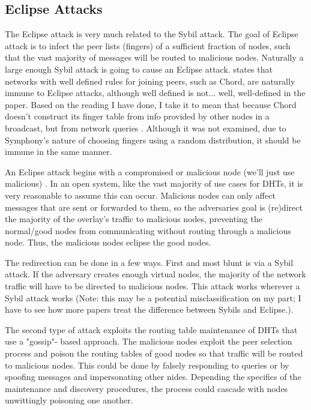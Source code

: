 \documentclass[10pt,letterpaper]{report}
\begin{document}
\subsection{Eclipse Attacks}
The Eclipse attack is very much related to the Sybil attack.  The goal of Eclipse attack is to infect the peer lists (fingers) of a sufficient fraction of nodes, such that the vast majority of messages will be routed to malicious nodes.  Naturally  a large enough Sybil attack is  going to cause an Eclipse attack. \cite{dhtsec} states that networks with well defined rules for joining peers, such as Chord, are naturally immune to Eclipse attacks, although well defined is not... well, well-defined in the paper.  Based on the reading I have done, I take it to mean that because Chord doesn't construct its finger table from info provided by other nodes in a broadcast, but from network queries .  Although it was not examined, due to Symphony's nature of choosing  fingers using a random distribution, it should be immune in the same manner.

An Eclipse attack begins with a compromised or malicious node (we'll just use malicious) \cite{induced}.  In an open system, like the vast majority of use cases for DHTs, it is very reasonable to assume this can occur.  Malicious nodes can only affect messages that are sent or forwarded to them, so the adversaries  goal is (re)direct the majority of the overlay's traffic to malicious nodes, preventing the normal/good nodes from communicating without routing through a malicious node.   Thus, the malicious nodes eclipse the good nodes.

The redirection can be done in a few ways.  First and most blunt is via a Sybil attack.  If the adversary creates enough virtual nodes, the majority of the network traffic will have to be directed to malicious nodes.  This attack works wherever a Sybil attack works  (Note: this may be a potential  misclassification on my part; I have to see how more papers treat the difference between Sybils and Eclipse.).

The second type of attack exploits the routing table maintenance of DHTs that use a "gossip"- based approach.  The malicious nodes exploit the peer selection process and poison the routing tables of good nodes so that traffic will be routed to malicious nodes.  This could be done by falsely responding to queries or by spoofing messages and impersonating other nides.   Depending the specifics of  the maintenance and discovery procedures,  the process could cascade with nodes unwittingly poisoning one another.
\end{document}
